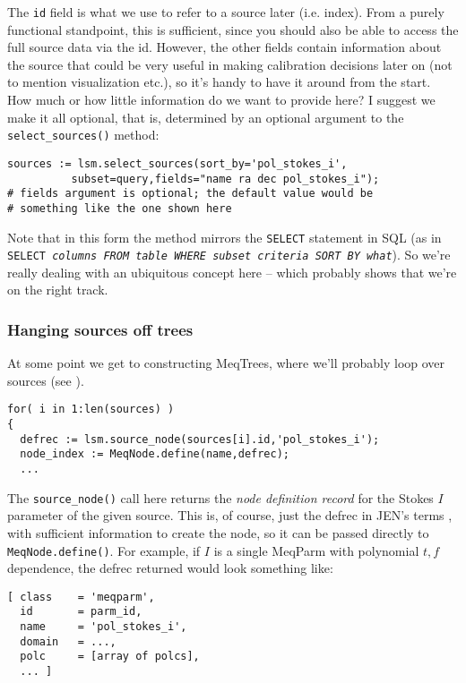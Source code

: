 \documentclass[]{lofar}
\begin{document}
  The {\tt id} field is what we use to refer to a source later (i.e. index). From
  a purely functional standpoint, this is sufficient, since you should also be
  able to access the full source data via the id. However, the other fields
  contain information about the source that could be very useful in making
  calibration decisions later on (not to mention visualization etc.), so it's
  handy to have it around from the start. How much or how little information do
  we want to provide here? I suggest we make it all optional, that is, determined
  by an optional argument to the {\tt select\_sources()} method:
  
\begin{verbatim}
sources := lsm.select_sources(sort_by='pol_stokes_i',
          subset=query,fields="name ra dec pol_stokes_i"); 
# fields argument is optional; the default value would be 
# something like the one shown here
\end{verbatim}
  
  Note that in this form the method mirrors the {\tt SELECT} statement in SQL (as
  in {\tt SELECT \em columns\tt\ FROM \em table\tt\  WHERE \em subset
  criteria\tt\ SORT BY \em what}). So we're really dealing with an ubiquitous
  concept here -- which probably shows that we're on the right track. 
  
\subsubsection{Hanging sources off trees}
  
  At some point we get to constructing MeqTrees, where we'll probably loop over
  sources (see \cite{PSS4}). 
  
\begin{verbatim}
for( i in 1:len(sources) )
{
  defrec := lsm.source_node(sources[i].id,'pol_stokes_i');
  node_index := MeqNode.define(name,defrec);
  ...
\end{verbatim}
  
  The {\tt source\_node()} call here returns the {\em node definition record} for
  the Stokes $I$ parameter of the given source. This is, of course, just the
  defrec in JEN's terms \cite{PSS4}, with sufficient information to create the
  node, so it can be passed directly to {\tt MeqNode.define()}. For example, if
  $I$ is a single MeqParm with polynomial $t,f$ dependence, the defrec returned
  would look something like:
  
\begin{verbatim}
[ class    = 'meqparm',
  id       = parm_id,
  name     = 'pol_stokes_i',
  domain   = ...,
  polc     = [array of polcs],
  ... ]
\end{verbatim} 
  
\end{document}

